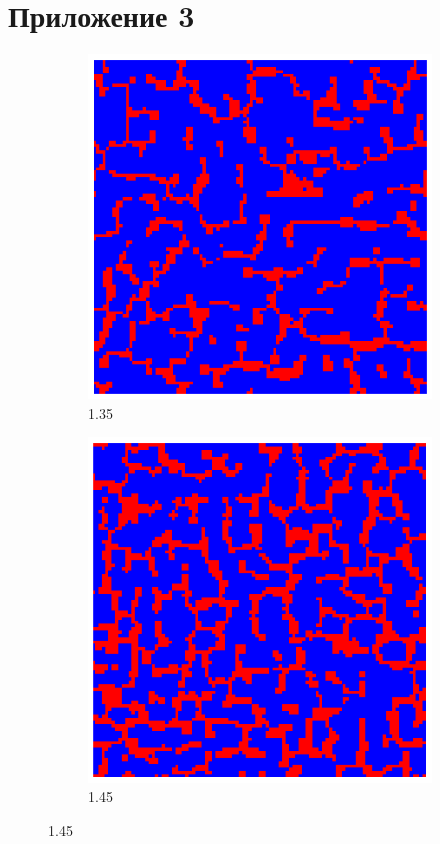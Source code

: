 \documentclass[a4paper]{article}
\begin{document}
\section{Приложение 3}
\begin{figure}[H]
	\begin{subfigure}{.5\textwidth}
		\includegraphics[width=.8\linewidth]{1.35-1.45-1.png}
		\caption{1.35}
	\end{subfigure}
	\begin{subfigure}{.5\textwidth}
		\includegraphics[width=.8\linewidth]{1.35-1.45-2.png}
		\caption{1.45}
	\end{subfigure}%
\end{figure}
\end{document}
